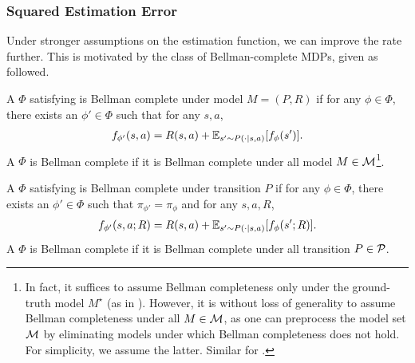 \subsubsection{Squared Estimation Error}
Under stronger assumptions on the estimation function, we can improve the rate further. 
This is motivated by the class of Bellman-complete MDPs, given as followed. 
\begin{definition}\label{def: sto bc} A $\Phi$ satisfying  is Bellman complete under model $M=(P, R)$ if for any $\phi\in\Phi$, there exists an $\phi'\in\Phi$ such that for any $s,a$,  
\begin{align*}
    f_{\phi'}(s,a) = R(s,a)+\mathbb{E}_{s'\sim P(\cdot|s,a)} [f_\phi(s')].  
\end{align*}
A $\Phi$ is Bellman complete if it is Bellman complete under all model $M\in\mathcal{M}$\footnote{In fact, it suffices to assume Bellman completeness only under the ground-truth model $M^\star$ (as in \cite{foster2024model}). However, it is without loss of generality to assume Bellman completeness under all $M\in\mathcal{M}$, as one can preprocess the model set $\mathcal{M}$ by eliminating models under which Bellman completeness does not hold. For simplicity, we assume the latter. Similar for . }. 
\end{definition}
\begin{definition}\label{def: adv bc} A $\Phi$ satisfying  is Bellman complete under transition $P$ if for any $\phi\in\Phi$, there exists an $\phi'\in\Phi$ such that $\pi_{\phi'}=\pi_\phi$ and for any $s,a,R$,  
\begin{align*}
    f_{\phi'}(s,a; R) = R(s,a) + \mathbb{E}_{s'\sim P(\cdot|s,a)}[f_\phi(s'; R)].  
\end{align*}
A $\Phi$ is Bellman complete if it is Bellman complete under all transition $P\in\mathcal{P}$. 
\end{definition}


